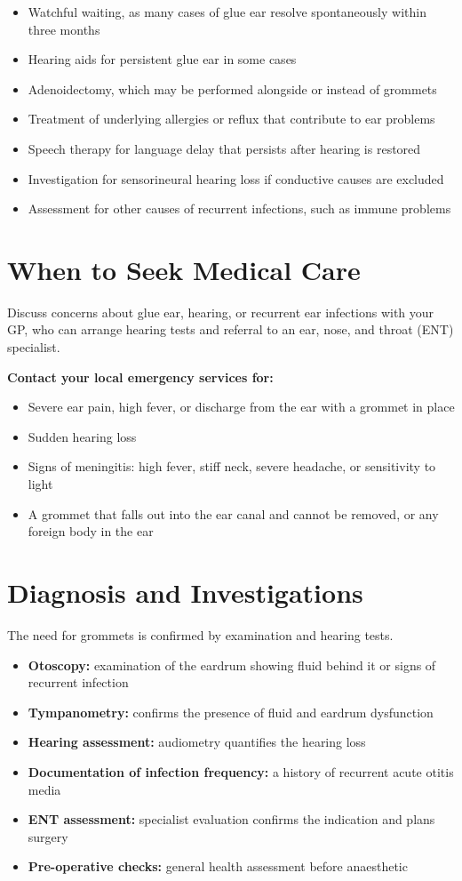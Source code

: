 \begin{itemize}
    \item Watchful waiting, as many cases of glue ear resolve spontaneously within three months
    \item Hearing aids for persistent glue ear in some cases
    \item Adenoidectomy, which may be performed alongside or instead of grommets
    \item Treatment of underlying allergies or reflux that contribute to ear problems
    \item Speech therapy for language delay that persists after hearing is restored
    \item Investigation for sensorineural hearing loss if conductive causes are excluded
    \item Assessment for other causes of recurrent infections, such as immune problems
\end{itemize}

\section*{When to Seek Medical Care}
Discuss concerns about glue ear, hearing, or recurrent ear infections with your GP, who can arrange hearing tests and referral to an ear, nose, and throat (ENT) specialist.

\textbf{Contact your local emergency services for:}
\begin{itemize}
    \item Severe ear pain, high fever, or discharge from the ear with a grommet in place
    \item Sudden hearing loss
    \item Signs of meningitis: high fever, stiff neck, severe headache, or sensitivity to light
    \item A grommet that falls out into the ear canal and cannot be removed, or any foreign body in the ear
\end{itemize}

\section*{Diagnosis and Investigations}
The need for grommets is confirmed by examination and hearing tests.

\begin{itemize}
    \item \textbf{Otoscopy:} examination of the eardrum showing fluid behind it or signs of recurrent infection
    \item \textbf{Tympanometry:} confirms the presence of fluid and eardrum dysfunction
    \item \textbf{Hearing assessment:} audiometry quantifies the hearing loss
    \item \textbf{Documentation of infection frequency:} a history of recurrent acute otitis media
    \item \textbf{ENT assessment:} specialist evaluation confirms the indication and plans surgery
    \item \textbf{Pre-operative checks:} general health assessment before anaesthetic
\end{itemize}

